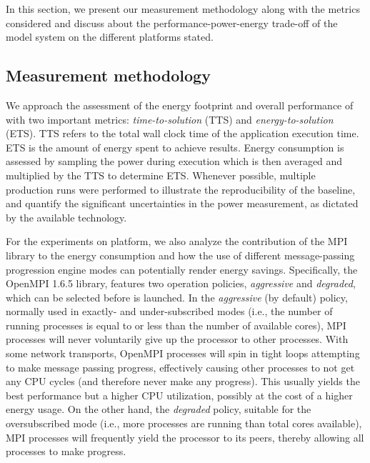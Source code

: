 In this section, we present our measurement methodology along with the
metrics  considered  and  discuss about  the  performance-power-energy
trade-off of the model system on the different platforms stated.

\subsection{Measurement methodology}
\label{subsec:4.1}

We  approach  the  assessment  of  the energy  footprint  and  overall
performance    of    \cosmoart    with    two    important    metrics:
\textit{time-to-solution} (TTS) and \textit{energy-to-solution} (ETS).
TTS refers to  the total wall clock time  of the application execution
time. ETS  is the amount of  energy spent to  achieve results.  Energy
consumption is  assessed by sampling the power  during execution which
is then averaged and multiplied  by the TTS to determine ETS. Whenever
possible, multiple  production runs  were performed to  illustrate the
reproducibility  of   the  baseline,  and   quantify  the  significant
uncertainties in  the power measurement, as dictated  by the available
technology.

For  the   experiments  on  \tinto  platform,  we   also  analyze  the
contribution of the MPI library  to the energy consumption and how the
use  of   different  message-passing  progression   engine  modes  can
potentially  render energy  savings. Specifically,  the  OpenMPI 1.6.5
library,  features  two   operation  policies,  \emph{aggressive}  and
\emph{degraded},   which   can  be   selected   before  \cosmoart   is
launched. In the \emph{aggressive}  (by default) policy, normally used
in exactly-  and under-subscribed modes  (i.e., the number  of running
processes is equal to or less than the number of available cores), MPI
processes  will  never voluntarily  give  up  the  processor to  other
processes. With  some network transports, OpenMPI  processes will spin
in  tight   loops  attempting   to  make  message   passing  progress,
effectively causing  other processes  to not get  any CPU  cycles (and
therefore  never make  any progress).   This usually  yields  the best
performance but  a higher CPU utilization,  possibly at the  cost of a
higher energy  usage.  On the other hand,  the \emph{degraded} policy,
suitable for the oversubscribed mode (i.e., more processes are running
than total  cores available), MPI processes will  frequently yield the
processor  to  its  peers,  thereby  allowing all  processes  to  make
progress.

